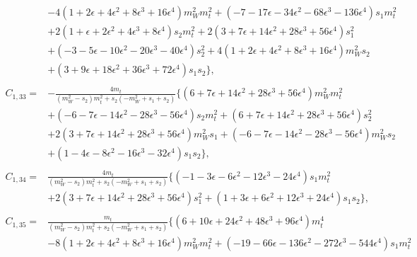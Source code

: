 \documentclass[twocolumn,aps,showpacs,nofootinbib,superscriptaddress,prd]{revtex4-2}
\begin{document}
\begin{widetext}
\begin{align}
\nonumber\\&
-4\left(1 +2 \epsilon +4 \epsilon^2 +8 \epsilon^3 +16 \epsilon^4\right)m_W^2m_t^2+\left(-7 -17 \epsilon -34 \epsilon^2 -68 \epsilon^3 -136 \epsilon^4\right)s_1m_t^2
\nonumber\\&
+2\left(1 +\epsilon +2 \epsilon^2 +4 \epsilon^3 +8 \epsilon^4\right)s_2m_t^2+2\left(3 +7 \epsilon +14 \epsilon^2 +28 \epsilon^3 +56 \epsilon^4\right)s_1^2
\nonumber\\&
+\left(-3 -5 \epsilon -10 \epsilon^2 -20 \epsilon^3 -40 \epsilon^4\right)s_2^2+4\left(1 +2 \epsilon +4 \epsilon^2 +8 \epsilon^3 +16 \epsilon^4\right)m_W^2s_2
\nonumber\\&
+\left(3 +9 \epsilon +18 \epsilon^2 +36 \epsilon^3 +72 \epsilon^4\right)s_1s_2\}
,\nonumber\\
\nonumber\\
C_{1,33}=&-\frac{4m_t}{\left(m_W^2-s_2\right)m_t^2+s_2\left(-m_W^2+s_1+s_2\right)}\{\left(6 +7 \epsilon +14 \epsilon^2 +28 \epsilon^3 +56 \epsilon^4\right)m_W^2m_t^2
\nonumber\\&
+\left(-6 -7 \epsilon -14 \epsilon^2 -28 \epsilon^3 -56 \epsilon^4\right)s_2m_t^2+\left(6 +7 \epsilon +14 \epsilon^2 +28 \epsilon^3 +56 \epsilon^4\right)s_2^2
\nonumber\\&
+2\left(3 +7 \epsilon +14 \epsilon^2 +28 \epsilon^3 +56 \epsilon^4\right)m_W^2s_1+\left(-6 -7 \epsilon -14 \epsilon^2 -28 \epsilon^3 -56 \epsilon^4\right)m_W^2s_2
\nonumber\\&
+\left(1 -4 \epsilon -8 \epsilon^2 -16 \epsilon^3 -32 \epsilon^4\right)s_1s_2\}
,\nonumber\\
\nonumber\\
C_{1,34}=&\frac{4m_t}{\left(m_W^2-s_2\right)m_t^2+s_2\left(-m_W^2+s_1+s_2\right)}\{\left(-1 -3 \epsilon -6 \epsilon^2 -12 \epsilon^3 -24 \epsilon^4\right)s_1m_t^2
\nonumber\\&
+2\left(3 +7 \epsilon +14 \epsilon^2 +28 \epsilon^3 +56 \epsilon^4\right)s_1^2+\left(1 +3 \epsilon +6 \epsilon^2 +12 \epsilon^3 +24 \epsilon^4\right)s_1s_2\}
,\nonumber\\
\nonumber\\
C_{1,35}=&\frac{m_t}{\left(m_W^2-s_2\right)m_t^2+s_2\left(-m_W^2+s_1+s_2\right)}\{\left(6 +10 \epsilon +24 \epsilon^2 +48 \epsilon^3 +96 \epsilon^4\right)m_t^4
\nonumber\\&
-8\left(1 +2 \epsilon +4 \epsilon^2 +8 \epsilon^3 +16 \epsilon^4\right)m_W^2m_t^2+\left(-19 -66 \epsilon -136 \epsilon^2 -272 \epsilon^3 -544 \epsilon^4\right)s_1m_t^2
\nonumber\\&

\end{align}
\end{widetext}
\end{document}
